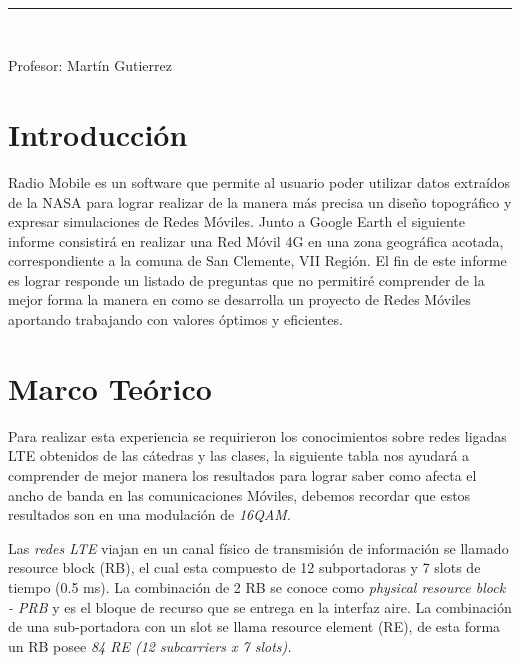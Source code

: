 \documentclass[Article, letterpaper,12pt]{article}
\begin{document}
\begin{titlepage}
\begin{center}
\begin{large}
\begin{small}
{}




\end{small}\\ 
\end{large}
\vspace*{0.4mm}
\rule{90mm}{0.1mm}\\
\vspace*{0.2in}
    \begin{large}
        Profesor: Martín Gutierrez\\
    \end{large}
\end{center}


\newpage 
\tableofcontents

\newpage
\end{titlepage}

\section{Introducción}
Radio Mobile es un software que permite al usuario poder utilizar datos extraídos de la NASA para lograr realizar de la manera más precisa un diseño topográfico y expresar simulaciones de Redes Móviles. Junto a Google Earth el siguiente informe consistirá en realizar una Red Móvil 4G en una zona geográfica acotada, correspondiente a la comuna de San Clemente, VII Región.
El fin de este informe es lograr responde un listado de preguntas que no permitiré comprender de la mejor forma la manera en como se desarrolla un proyecto de Redes Móviles aportando trabajando con valores óptimos y eficientes.

\section{Marco Teórico}
Para realizar esta experiencia se requirieron los conocimientos sobre redes ligadas LTE obtenidos de las cátedras y las clases, la siguiente tabla nos ayudará a comprender de mejor manera los resultados para lograr saber como afecta el ancho de banda en las comunicaciones Móviles, debemos recordar que estos resultados son en una modulación de \textit{16QAM}.

Las \textit{redes LTE} viajan en un  canal físico de transmisión de información se llamado resource block (RB), el cual esta compuesto de 12 subportadoras y 7 slots de tiempo (0.5 ms). La combinación de 2 RB se conoce como \textit{physical resource block - PRB} y es el bloque de recurso
que se entrega en la interfaz aire. La combinación de una sub-portadora con un slot
se llama resource element (RE), de esta forma un RB posee \textit{84 RE (12 subcarriers
x 7 slots).
}
\end{document}
